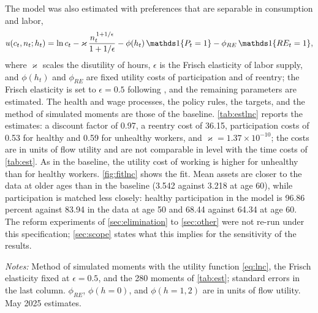 The model was also estimated with preferences that are separable in consumption and labor, %
\begin{equation}\label{eq:lnc}
u(c_t,n_t;h_t)=\ln c_t-\varkappa\,\frac{n_t^{\,1+1/\epsilon}}{1+1/\epsilon}-\phi(h_t)\,\ind{P_t=1}-\phi_{RE}\,\ind{RE_t=1},
\end{equation}
where $\varkappa$ scales the disutility of hours, $\epsilon$ is the Frisch elasticity of labor supply, and $\phi(h_t)$ and $\phi_{RE}$ are fixed utility costs of participation and of reentry; the Frisch elasticity is set to $\epsilon=0.5$ following \citet{chetty2012bounds}, and the remaining parameters are estimated. %
The health and wage processes, the policy rules, the targets, and the method of simulated moments are those of the baseline. %
\autoref{tab:estlnc} reports the estimates: a discount factor of 0.97, a reentry cost of 36.15, participation costs of 0.53 for healthy and 0.59 for unhealthy workers, and $\varkappa=1.37\times 10^{-10}$; the costs are in units of flow utility and are not comparable in level with the time costs of \autoref{tab:est}. %
As in the baseline, the utility cost of working is higher for unhealthy than for healthy workers. %
\autoref{fig:fitlnc} shows the fit. Mean assets are closer to the data at older ages than in the baseline (3.542 against 3.218 at age 60), while participation is matched less closely: healthy participation in the model is 96.86 percent against 83.94 in the data at age 50 and 68.44 against 64.34 at age 60. %
The reform experiments of \autoref{sec:elimination} to \autoref{sec:other} were not re-run under this specification; \autoref{sec:scope} states what this implies for the sensitivity of the results.

\begin{table}[!htbp]
\centering
\caption{Estimated Parameters under Logarithmic Preferences}
\label{tab:estlnc}
\vspace{6pt}
\footnotesize
\begin{threeparttable}

\begin{tablenotes}[flushleft]\scriptsize
\item[] \textit{Notes:} Method of simulated moments with the utility function \eqref{eq:lnc}, the Frisch elasticity fixed at $\epsilon=0.5$, and the 280 moments of \autoref{tab:est}; standard errors in the last column. $\phi_{RE}$, $\phi(h{=}0)$, and $\phi(h{=}1,2)$ are in units of flow utility. May 2025 estimates.
\end{tablenotes}
\end{threeparttable}
\end{table}

